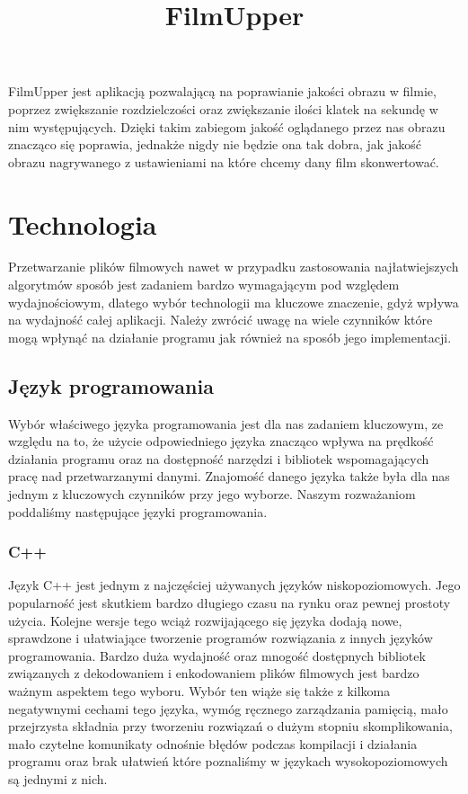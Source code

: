 \documentclass[twoside]{projektInzynierskiMS}
\title{FilmUpper}
\begin{document}
FilmUpper jest aplikacją pozwalającą na poprawianie jakości obrazu w filmie, poprzez zwiększanie rozdzielczości oraz zwiększanie ilości klatek na sekundę w nim występujących. Dzięki takim zabiegom jakość oglądanego przez nas obrazu znacząco się poprawia, jednakże nigdy nie będzie ona tak dobra, jak jakość obrazu nagrywanego z ustawieniami na które chcemy dany film skonwertować. 



\section{Technologia}


Przetwarzanie plików filmowych nawet w przypadku zastosowania najłatwiejszych algorytmów sposób jest zadaniem bardzo wymagającym pod względem wydajnościowym, dlatego wybór technologii ma kluczowe znaczenie, gdyż wpływa na wydajność całej aplikacji. Należy zwrócić uwagę na wiele czynników które mogą wpłynąć na działanie programu jak również na sposób jego implementacji.


\subsection{Język programowania}

Wybór właściwego języka programowania jest dla nas zadaniem kluczowym, ze względu na to, że użycie odpowiedniego języka znacząco wpływa na prędkość działania programu oraz na dostępność narzędzi i bibliotek wspomagających pracę nad przetwarzanymi danymi. Znajomość danego języka także była dla nas jednym z kluczowych czynników przy jego wyborze. Naszym rozważaniom poddaliśmy następujące języki programowania.

\subsubsection{C++}
Język C++ jest jednym z najczęściej używanych języków niskopoziomowych. Jego popularność jest skutkiem bardzo długiego czasu na rynku oraz pewnej prostoty użycia. Kolejne wersje tego wciąż rozwijającego się języka dodają nowe, sprawdzone i ułatwiające tworzenie programów rozwiązania z innych języków programowania. Bardzo duża wydajność oraz mnogość dostępnych bibliotek związanych z dekodowaniem i enkodowaniem plików filmowych jest bardzo ważnym aspektem tego wyboru. Wybór ten wiąże się także z kilkoma negatywnymi cechami tego języka, wymóg ręcznego zarządzania pamięcią, mało przejrzysta składnia przy tworzeniu rozwiązań o dużym stopniu skomplikowania, mało czytelne komunikaty odnośnie błędów podczas kompilacji i działania programu oraz brak ułatwień które poznaliśmy w językach wysokopoziomowych są jednymi z nich. 
\end{document}
